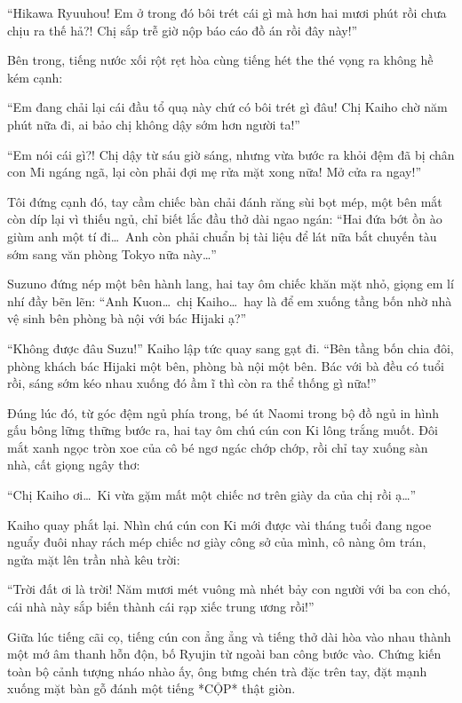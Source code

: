 ﻿\documentclass[../main.tex]{subfiles}
\begin{document}
``Hikawa Ryuuhou! Em ở trong đó bôi trét cái gì mà hơn hai mươi phút rồi chưa chịu ra thế hả?! Chị sắp trễ giờ nộp báo cáo đồ án rồi đây này!''

Bên trong, tiếng nước xối rột rẹt hòa cùng tiếng hét the thé vọng ra không hề kém cạnh:

``Em đang chải lại cái đầu tổ quạ này chứ có bôi trét gì đâu! Chị Kaiho chờ năm phút nữa đi, ai bảo chị không dậy sớm hơn người ta!''

``Em nói cái gì?! Chị dậy từ sáu giờ sáng, nhưng vừa bước ra khỏi đệm đã bị chân con Mi ngáng ngã, lại còn phải đợi mẹ rửa mặt xong nữa! Mở cửa ra ngay!''

Tôi đứng cạnh đó, tay cầm chiếc bàn chải đánh răng sùi bọt mép, một bên mắt còn díp lại vì thiếu ngủ, chỉ biết lắc đầu thở dài ngao ngán: ``Hai đứa bớt ồn ào giùm anh một tí đi\dots\ Anh còn phải chuẩn bị tài liệu để lát nữa bắt chuyến tàu sớm sang văn phòng Tokyo nữa này\dots''

Suzuno đứng nép một bên hành lang, hai tay ôm chiếc khăn mặt nhỏ, giọng em lí nhí đầy bẽn lẽn: ``Anh Kuon\dots\ chị Kaiho\dots\ hay là để em xuống tầng bốn nhờ nhà vệ sinh bên phòng bà nội với bác Hijaki ạ?''

``Không được đâu Suzu!'' Kaiho lập tức quay sang gạt đi. ``Bên tầng bốn chia đôi, phòng khách bác Hijaki một bên, phòng bà nội một bên. Bác với bà đều có tuổi rồi, sáng sớm kéo nhau xuống đó ầm ĩ thì còn ra thể thống gì nữa!''

Đúng lúc đó, từ góc đệm ngủ phía trong, bé út Naomi trong bộ đồ ngủ in hình gấu bông lững thững bước ra, hai tay ôm chú cún con Ki lông trắng muốt. Đôi mắt xanh ngọc tròn xoe của cô bé ngơ ngác chớp chớp, rồi chỉ tay xuống sàn nhà, cất giọng ngây thơ:

``Chị Kaiho ơi\dots\ Ki vừa gặm mất một chiếc nơ trên giày da của chị rồi ạ\dots''

Kaiho quay phắt lại. Nhìn chú cún con Ki mới được vài tháng tuổi đang ngoe nguẩy đuôi nhay rách mép chiếc nơ giày công sở của mình, cô nàng ôm trán, ngửa mặt lên trần nhà kêu trời:

``Trời đất ơi là trời! Năm mươi mét vuông mà nhét bảy con người với ba con chó, cái nhà này sắp biến thành cái rạp xiếc trung ương rồi!''

Giữa lúc tiếng cãi cọ, tiếng cún con ẳng ẳng và tiếng thở dài hòa vào nhau thành một mớ âm thanh hỗn độn, bố Ryujin từ ngoài ban công bước vào. Chứng kiến toàn bộ cảnh tượng nháo nhào ấy, ông bưng chén trà đặc trên tay, đặt mạnh xuống mặt bàn gỗ đánh một tiếng *CỘP* thật giòn.
\end{document}
